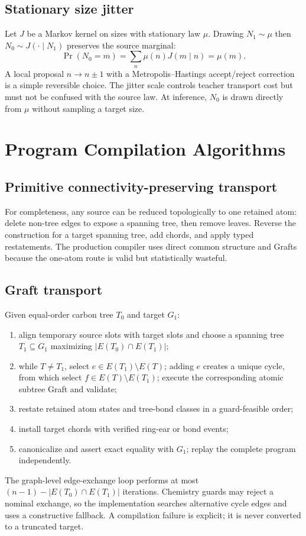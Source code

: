 \documentclass{article}
\theoremstyle{definition}
\theoremstyle{remark}
\begin{document}
\subsection{Stationary size jitter}

Let $J$ be a Markov kernel on sizes with stationary law $\mu$. Drawing $N_1\sim\mu$ then $N_0\sim J(\cdot\mid N_1)$ preserves the source marginal:
\begin{equation}
\Pr(N_0=m)=\sum_n\mu(n)J(m\mid n)=\mu(m).
\end{equation}
A local proposal $n\to n\pm1$ with a Metropolis--Hastings accept/reject correction is a simple reversible choice. The jitter scale controls teacher transport cost but must not be confused with the source law. At inference, $N_0$ is drawn directly from $\mu$ without sampling a target size.

\section{Program Compilation Algorithms}\label{app:compiler}

\subsection{Primitive connectivity-preserving transport}

For completeness, any source can be reduced topologically to one retained atom: delete non-tree edges to expose a spanning tree, then remove leaves. Reverse the construction for a target spanning tree, add chords, and apply typed restatements. The production compiler uses direct common structure and Grafts because the one-atom route is valid but statistically wasteful.

\subsection{Graft transport}

Given equal-order carbon tree $T_0$ and target $G_1$:
\begin{enumerate}[leftmargin=*]
    \item align temporary source slots with target slots and choose a spanning tree $T_1\subseteq G_1$ maximizing $|E(T_0)\cap E(T_1)|$;
    \item while $T\neq T_1$, select $e\in E(T_1)\setminus E(T)$; adding $e$ creates a unique cycle, from which select $f\in E(T)\setminus E(T_1)$; execute the corresponding atomic subtree Graft and validate;
    \item restate retained atom states and tree-bond classes in a guard-feasible order;
    \item install target chords with verified ring-ear or bond events;
    \item canonicalize and assert exact equality with $G_1$; replay the complete program independently.
\end{enumerate}
The graph-level edge-exchange loop performs at most $(n-1)-|E(T_0)\cap E(T_1)|$ iterations. Chemistry guards may reject a nominal exchange, so the implementation searches alternative cycle edges and uses a constructive fallback. A compilation failure is explicit; it is never converted to a truncated target.
\end{document}
